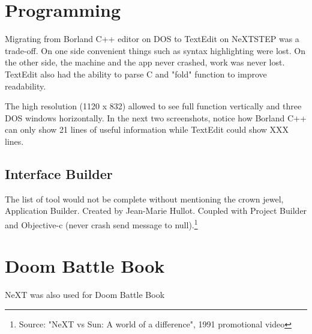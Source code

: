 
\section{Programming}
Migrating from Borland C++ editor on DOS to TextEdit on NeXTSTEP was a trade-off. On one side convenient things such as syntax highlighting were lost. On the other side, the machine and the app never crashed, work was never lost. TextEdit also had the ability to parse C and "fold" function to improve readability.\\
\par
 The high resolution (1120 x 832) allowed to see full function vertically and three DOS windows horizontally. In the next two screenshots, notice how Borland C++ can only show 21 lines of useful information while TextEdit could show XXX lines.\\
\par
{}
\par
{}

\subsection{Interface Builder}
The list of tool would not be complete without mentioning the crown jewel, Application Builder. 
Created by Jean-Marie Hullot. Coupled with Project Builder and Objective-c (never crash send message to null).\footnote{Source: "NeXT vs Sun: A world of a difference", 1991 promotional video}

\par
\section{Doom Battle Book}
NeXT was also used for Doom Battle Book\\

